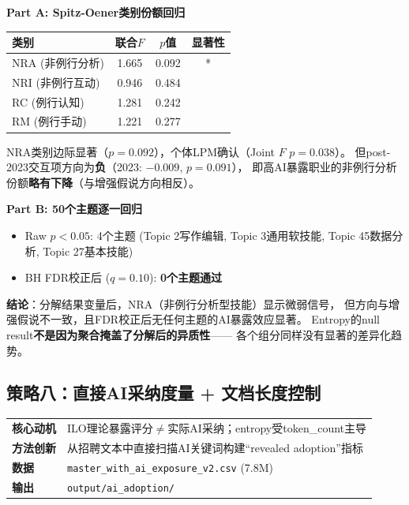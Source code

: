 \documentclass[12pt,a4paper]{ctexart}
\begin{document}
\begin{resultbox}[策略七结果]
\textbf{Part A: Spitz-Oener类别份额回归}

\begin{center}
\begin{tabular}{lccc}
\toprule
类别 & 联合$F$ & $p$值 & 显著性 \\
\midrule
NRA (非例行分析) & 1.665 & 0.092 & * \\
NRI (非例行互动) & 0.946 & 0.484 & \\
RC (例行认知) & 1.281 & 0.242 & \\
RM (例行手动) & 1.221 & 0.277 & \\
\bottomrule
\end{tabular}
\end{center}

NRA类别边际显著（$p=0.092$），个体LPM确认（Joint $F$ $p=0.038$）。
但post-2023交互项方向为\textbf{负}（2023: $-0.009$, $p=0.091$），
即高AI暴露职业的非例行分析份额\textbf{略有下降}（与增强假说方向相反）。

\textbf{Part B: 50个主题逐一回归}
\begin{itemize}
\item Raw $p<0.05$: 4个主题 (Topic 2写作编辑, Topic 3通用软技能, Topic 45数据分析, Topic 27基本技能)
\item BH FDR校正后 ($q=0.10$): \textbf{0个主题通过}
\end{itemize}

\textbf{结论}：分解结果变量后，NRA（非例行分析型技能）显示微弱信号，
但方向与增强假说不一致，且FDR校正后无任何主题的AI暴露效应显著。
Entropy的null result\textbf{不是因为聚合掩盖了分解后的异质性}——
各个组分同样没有显著的差异化趋势。
\end{resultbox}


\subsection{策略八：直接AI采纳度量 + 文档长度控制}
\label{subsec:ai_adoption_old}
\label{subsec:ai_adoption}

\begin{center}
\begin{tabular}{ll}
\textbf{核心动机} & ILO理论暴露评分$\neq$实际AI采纳；entropy受token\_count主导 \\
\textbf{方法创新} & 从招聘文本中直接扫描AI关键词构建``revealed adoption''指标 \\
\textbf{数据} & \texttt{master\_with\_ai\_exposure\_v2.csv} (7.8M) \\
\textbf{输出} & \texttt{output/ai\_adoption/}
\end{tabular}
\end{center}
\end{document}
